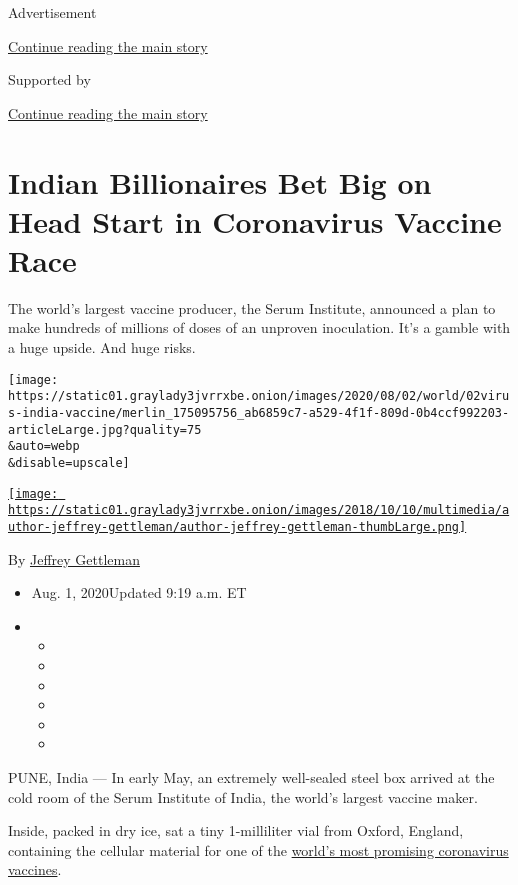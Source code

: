 Advertisement

\protect\hyperlink{after-top}{Continue reading the main story}

Supported by

\protect\hyperlink{after-sponsor}{Continue reading the main story}

\hypertarget{indian-billionaires-bet-big-on-head-start-in-coronavirus-vaccine-race}{%
\section{Indian Billionaires Bet Big on Head Start in Coronavirus
Vaccine
Race}\label{indian-billionaires-bet-big-on-head-start-in-coronavirus-vaccine-race}}

The world's largest vaccine producer, the Serum Institute, announced a
plan to make hundreds of millions of doses of an unproven inoculation.
It's a gamble with a huge upside. And huge risks.

\texttt{[image: https://static01.graylady3jvrrxbe.onion/images/2020/08/02/world/02virus-india-vaccine/merlin\_175095756\_ab6859c7-a529-4f1f-809d-0b4ccf992203-articleLarge.jpg?quality=75\\\&auto=webp\\\&disable=upscale]}

\href{https://www.nytimes3xbfgragh.onion/by/jeffrey-gettleman}{\texttt{[image: https://static01.graylady3jvrrxbe.onion/images/2018/10/10/multimedia/author-jeffrey-gettleman/author-jeffrey-gettleman-thumbLarge.png]}}

By
\href{https://www.nytimes3xbfgragh.onion/by/jeffrey-gettleman}{Jeffrey
Gettleman}

\begin{itemize}
\item
  Aug. 1, 2020Updated 9:19 a.m. ET
\item
  \begin{itemize}
  \item
  \item
  \item
  \item
  \item
  \item
  \end{itemize}
\end{itemize}

PUNE, India --- In early May, an extremely well-sealed steel box arrived
at the cold room of the Serum Institute of India, the world's largest
vaccine maker.

Inside, packed in dry ice, sat a tiny 1-milliliter vial from Oxford,
England, containing the cellular material for one of the
\href{https://www.nytimes3xbfgragh.onion/2020/04/27/world/europe/coronavirus-vaccine-update-oxford.html}{world's
most promising coronavirus vaccines}.

